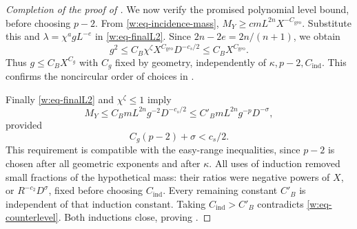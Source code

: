 \begin{proof}[Completion of the proof of ]
We now verify the promised polynomial level bound, before choosing
$p-2$.  From \eqref{w:eq-incidence-mass},
$M_Y\geq cmL^{2n}X^{-C_{\mathrm{geo}}}$.  Substitute this and
$\lambda=\chi^agL^{-e}$ in \eqref{w:eq-finalL2}.  Since
$2n-2e=2n/(n+1)$, we obtain
\[
 g^2\leq C_B\chi^{\zeta}X^{C_{\mathrm{geo}}}D^{-c_s/2}
 \leq C_BX^{C_{\mathrm{geo}}}.
\]
Thus $g\leq C_BX^{C_g}$ with $C_g$ fixed by geometry, independently
of $\kappa,p-2,C_{\mathrm{ind}}$.  This confirms the noncircular order
of choices in .

Finally \eqref{w:eq-finalL2} and $\chi^{\zeta}\leq1$ imply
\[
 M_Y\leq C_BmL^{2n}g^{-2}D^{-c_s/2}
 \leq C'_BmL^{2n}g^{-p}D^{-\sigma},
\]
provided
\[
 C_g(p-2)+\sigma<c_s/2.
\]
This requirement is compatible with the easy-range inequalities,
since $p-2$ is chosen after all geometric exponents and after $\kappa$.
All uses of induction removed small fractions of the hypothetical
mass: their ratios were negative powers of $X$, or
$R^{-c_2}D^\sigma$, fixed before choosing $C_{\mathrm{ind}}$.
Every remaining constant $C'_B$ is independent of that induction
constant.  Taking $C_{\mathrm{ind}}>C'_B$ contradicts
\eqref{w:eq-counterlevel}.  Both inductions close, proving
.
\end{proof}
